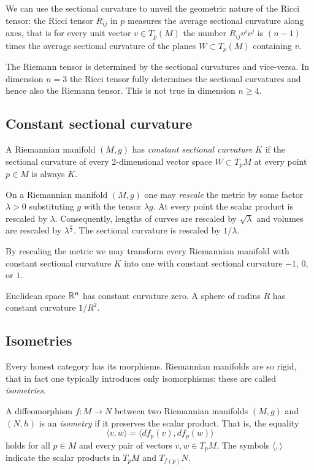 We can use the sectional curvature to unveil the geometric nature of the Ricci tensor:
the Ricci tensor $R_{ij}$ in $p$ measures the average sectional curvature along axes, that is for every unit vector $v\in T_p(M)$ the number $R_{ij} v^iv^j$ is $(n-1)$ times the average sectional curvature of the planes $W\subset T_p(M)$ containing $v$.

The Riemann tensor is determined by the sectional curvatures and vice-versa. In dimension $n=3$ the Ricci tensor fully determines the sectional curvatures and hence also the Riemann tensor. This is not true in dimension $n\geqslant 4$.

\subsection{Constant sectional curvature}
A Riemannian manifold $(M,g)$ has \emph{constant sectional curvature} $K$ if the sectional curvature of every 2-dimensional vector space $W\subset T_pM$ at every point $p\in M$ is always $K$.

\begin{oss}
On a Riemannian manifold $(M,g)$ one may \emph{rescale} the metric by some factor $\lambda >0$ substituting $g$ with the tensor $\lambda g$. At every point the scalar product is rescaled by $\lambda$. Consequently, lengths of curves are rescaled by $\sqrt \lambda$ and volumes are rescaled by $\lambda^{\frac n2}$. The sectional curvature is rescaled by $1/\lambda$. 
\end{oss}

By rescaling the metric we may transform every Riemannian manifold with constant sectional curvature $K$ into one with constant sectional curvature $-1$, $0$, or $1$.

\begin{example}
Euclidean space $\mathbb{R}^n$ has constant curvature zero. A sphere of radius $R$ has constant curvature $1/R^2$.
\end{example}

\subsection{Isometries}
Every honest category has its morphisms. Riemannian manifolds are so rigid, that in fact one typically introduces only isomorphisms: these are called \emph{isometries}.

\begin{defn}
A diffeomorphism $f\colon M\to N$ between two Riemannian manifolds $(M,g)$ and $(N,h)$ is an \emph{isometry} if it preserves the scalar product. That is, the equality
$$\langle v,w \rangle = \langle df_p(v), df_p(w) \rangle$$
holds for all $p\in M$ and every pair of vectors $v,w \in T_pM$. The symbols $\langle,\rangle$ indicate the scalar products in $T_pM$ and $T_{f(p)}N$.
\end{defn}

